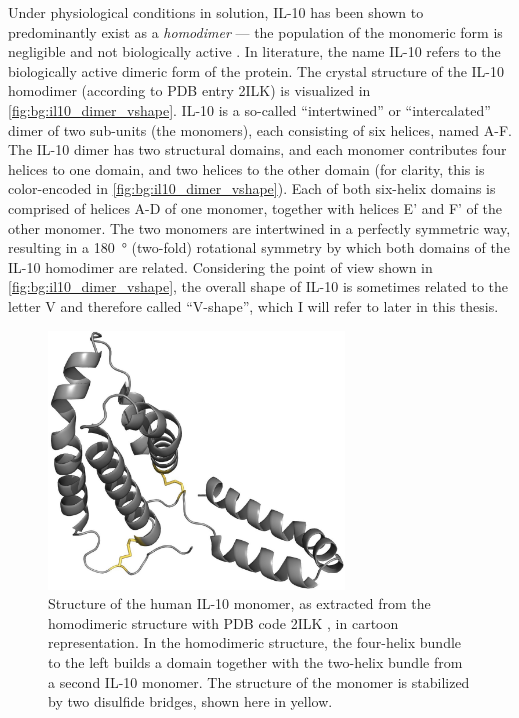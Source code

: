 Under physiological conditions in solution, IL-10 has been shown to
predominantly exist as a \textit{homodimer} --- the population of the monomeric
form is negligible and not biologically active \cite{syto_il10_homodimer_1998}.
In literature, the name IL-10 refers to the biologically active dimeric form of
the protein. The crystal structure of the IL-10 homodimer (according to PDB
entry 2ILK) is visualized in \cref{fig:bg:il10_dimer_vshape}. IL-10 is a
so-called \enquote{intertwined} or \enquote{intercalated} dimer of two sub-units
(the monomers), each consisting of six helices, named A-F. The IL-10 dimer has
two structural domains, and each monomer contributes four helices to one domain,
and two helices to the other domain (for clarity, this is color-encoded in
\cref{fig:bg:il10_dimer_vshape}). Each of both six-helix domains is comprised of
helices A-D of one monomer, together with helices E' and F' of the other
monomer. The two monomers are intertwined in a perfectly symmetric way,
resulting in a \SI{180}{\degree} (two-fold) rotational symmetry by which both
domains of the IL-10 homodimer are related. Considering the point of view shown
in \cref{fig:bg:il10_dimer_vshape}, the overall shape of IL-10 is sometimes
related to the letter V and therefore called \enquote{V-shape}, which I will
refer to later in this thesis.

\begin{figure}
\centering
\includegraphics[width=0.7\textwidth]{gfx/background/IL10_2ilk_disulfide_with.jpg}
\caption[]{
Structure of the human IL-10 monomer, as extracted from the homodimeric
structure with PDB code 2ILK \cite{Zdanov1996}, in cartoon representation. In
the homodimeric structure, the four-helix bundle to the left builds a domain
together with the two-helix bundle from a second IL-10 monomer. The structure of
the monomer is stabilized by two disulfide bridges, shown here in yellow. }
\label{fig:bg:il10_monomer_disulfide}
\end{figure}

